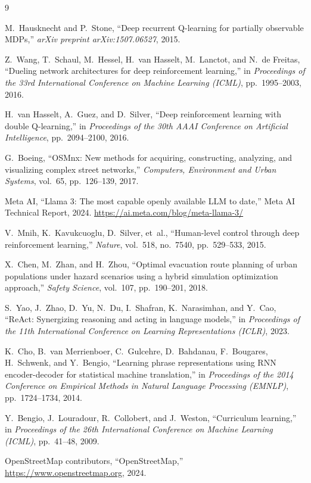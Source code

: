 \documentclass[11pt]{article}
\begin{document}
\begin{thebibliography}{9}

M.~Hausknecht and P.~Stone,
``Deep recurrent Q-learning for partially observable MDPs,''
\textit{arXiv preprint arXiv:1507.06527}, 2015.

Z.~Wang, T.~Schaul, M.~Hessel, H.~van Hasselt, M.~Lanctot, and N.~de Freitas,
``Dueling network architectures for deep reinforcement learning,''
in \textit{Proceedings of the 33rd International Conference on Machine Learning (ICML)}, pp.~1995--2003, 2016.

H.~van Hasselt, A.~Guez, and D.~Silver,
``Deep reinforcement learning with double Q-learning,''
in \textit{Proceedings of the 30th AAAI Conference on Artificial Intelligence}, pp.~2094--2100, 2016.

G.~Boeing,
``OSMnx: New methods for acquiring, constructing, analyzing, and visualizing complex street networks,''
\textit{Computers, Environment and Urban Systems}, vol.~65, pp.~126--139, 2017.

Meta AI,
``Llama 3: The most capable openly available LLM to date,''
Meta AI Technical Report, 2024.
\url{https://ai.meta.com/blog/meta-llama-3/}

V.~Mnih, K.~Kavukcuoglu, D.~Silver, et~al.,
``Human-level control through deep reinforcement learning,''
\textit{Nature}, vol.~518, no.~7540, pp.~529--533, 2015.

X.~Chen, M.~Zhan, and H.~Zhou,
``Optimal evacuation route planning of urban populations under hazard scenarios using a hybrid simulation optimization approach,''
\textit{Safety Science}, vol.~107, pp.~190--201, 2018.

S.~Yao, J.~Zhao, D.~Yu, N.~Du, I.~Shafran, K.~Narasimhan, and Y.~Cao,
``ReAct: Synergizing reasoning and acting in language models,''
in \textit{Proceedings of the 11th International Conference on Learning Representations (ICLR)}, 2023.

K.~Cho, B.~van Merrienboer, C.~Gulcehre, D.~Bahdanau, F.~Bougares, H.~Schwenk, and Y.~Bengio,
``Learning phrase representations using RNN encoder-decoder for statistical machine translation,''
in \textit{Proceedings of the 2014 Conference on Empirical Methods in Natural Language Processing (EMNLP)}, pp.~1724--1734, 2014.

Y.~Bengio, J.~Louradour, R.~Collobert, and J.~Weston,
``Curriculum learning,''
in \textit{Proceedings of the 26th International Conference on Machine Learning (ICML)}, pp.~41--48, 2009.

OpenStreetMap contributors,
``OpenStreetMap,''
\url{https://www.openstreetmap.org}, 2024.

\end{thebibliography}
\end{document}
